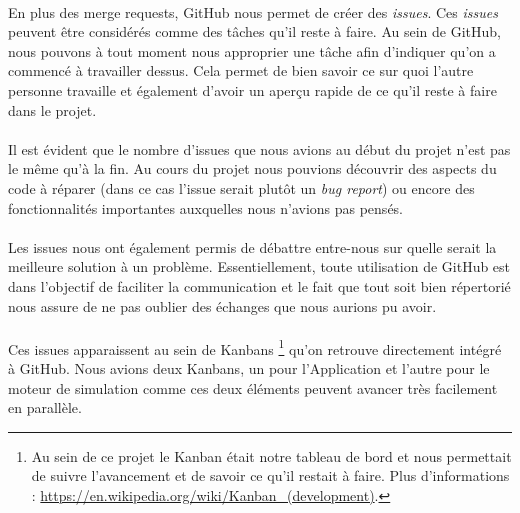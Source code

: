 \documentclass{EPUProjetDi}
\begin{document}
\paragraph{}
En plus des merge requests, GitHub nous permet de créer des \textit{issues}.
Ces \textit{issues} peuvent être considérés comme des tâches qu'il reste à faire. Au sein de GitHub, nous
pouvons à tout moment nous approprier une tâche afin d'indiquer qu'on a commencé à travailler dessus. Cela 
permet de bien savoir ce sur quoi l'autre personne travaille et également d'avoir un aperçu rapide de ce qu'il reste à faire dans le projet.

\paragraph{}
Il est évident que le nombre d'issues que nous avions au début du projet n'est pas le même qu'à la fin. Au cours du projet nous
pouvions découvrir des aspects du code à réparer (dans ce cas l'issue serait plutôt un \textit{bug report}) ou encore des fonctionnalités
importantes auxquelles nous n'avions pas pensés.

\paragraph{}
Les issues nous ont également permis de débattre entre-nous sur quelle serait la meilleure solution à un problème. Essentiellement, toute utilisation
de GitHub est dans l'objectif de faciliter la communication et le fait que tout soit bien répertorié nous assure de ne pas oublier des échanges que 
nous aurions pu avoir.

\paragraph{}
Ces issues apparaissent au sein de Kanbans \footnote{Au sein de ce projet le Kanban était notre tableau de bord et nous permettait de suivre 
l'avancement et de savoir ce qu'il restait à faire. Plus d'informations : \url{https://en.wikipedia.org/wiki/Kanban_(development)}.}
qu'on retrouve directement intégré à GitHub. Nous avions deux Kanbans, un pour l'Application et l'autre pour le moteur de simulation comme ces deux éléments peuvent avancer très facilement en parallèle.
\end{document}
